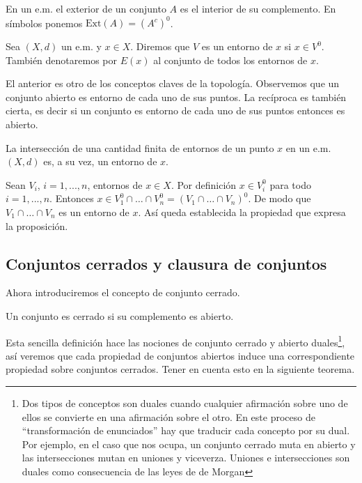 \begin{definicion}{} En un e.m. el exterior de un conjunto $A$ es el
interior de su complemento. En símbolos ponemos
$\text{Ext}(A)=(A^c)^0$.
\end{definicion}


\begin{definicion}{} Sea $(X,d)$ un e.m. y $x\in X$. Diremos que $V$
es un entorno de $x$ si $x\in V^0$. También denotaremos por
$E(x)$ al conjunto de todos los entornos de $x$.
\end{definicion}

El anterior es otro de los conceptos claves de la topología.
Observemos que un conjunto abierto es entorno de cada uno de sus
puntos. La recíproca es también cierta, es decir si un
conjunto es entorno de cada uno de sus puntos entonces es abierto.

\begin{proposicion}{} La intersección de una cantidad finita de
entornos de un punto $x$ en un e.m. $(X,d)$ es, a su vez, un
entorno de $x$.
\end{proposicion}
\begin{demo} Sean $V_i$, $i=1,...,n$, entornos de $x\in X$. Por
definición $x\in V_i^0$ para todo $i=1,...,n$. Entonces $x\in
V_1^0\cap\dots\cap V_n^0=(V_1\cap\dots\cap V_n)^0$. De modo que
$V_1\cap\dots\cap V_n$ es un entorno de $x$. Así queda
establecida la propiedad que expresa la proposición.
\end{demo}

\subsection{Conjuntos cerrados y clausura de
conjuntos}

Ahora introduciremos el concepto de conjunto cerrado.
\begin{definicion}{} Un conjunto es cerrado si su complemento es
abierto.
\end{definicion}

Esta sencilla definición hace las nociones de conjunto cerrado y
abierto duales\footnote{Dos tipos de conceptos son duales cuando
cualquier afirmación sobre uno de ellos se convierte en una
afirmación sobre el otro. En este proceso de ``transformación
de enunciados'' hay que traducir cada concepto por su dual. Por
ejemplo, en el caso que nos ocupa, un conjunto cerrado muta en
abierto y las intersecciones mutan en uniones y viceverza. Uniones
e intersecciones son duales como consecuencia de las leyes de de
Morgan}, así veremos que cada propiedad de conjuntos abiertos
induce una correspondiente propiedad sobre conjuntos cerrados.
Tener en cuenta esto en la siguiente teorema.

